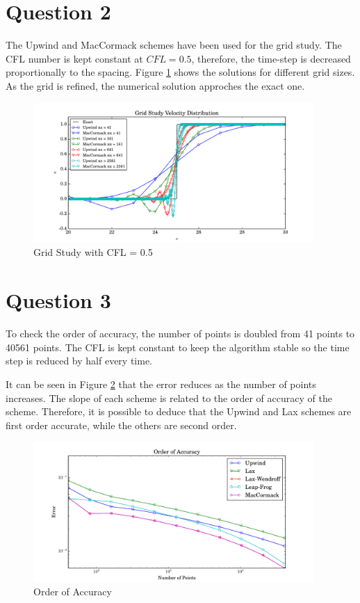 \documentclass[letterpaper,12pt,]{article}
\begin{document}
\newpage
\section*{Question 2}

The Upwind and MacCormack schemes have been used for the grid study.
The CFL number is kept constant at $CFL = 0.5$, therefore, the time-step is decreased proportionally to the spacing.
Figure \ref{fig:q2} shows the solutions for different grid sizes.
As the grid is refined, the numerical solution approches the exact one. 
\begin{figure}[!h]
    \centering
    \includegraphics[width = 0.95\textwidth]{./Figures/q2}
    \caption{Grid Study with CFL = 0.5}
    \label{fig:q2}
\end{figure}

\newpage
\section*{Question 3}

To check the order of accuracy, the number of points is doubled from 41 points to 40561 points.
The CFL is kept constant to keep the algorithm stable so the time step is reduced by half every time.

It can be seen in Figure \ref{fig:q3} that the error reduces as the number of points increases.
The slope of each scheme is related to the order of accuracy of the scheme. 
Therefore, it is possible to deduce that the Upwind and Lax schemes are first order accurate, while the others are second order.

\begin{figure}[!h]
    \centering
    \includegraphics[width = 0.95\textwidth]{./Figures/q3}
    \caption{Order of Accuracy}
    \label{fig:q3}
\end{figure}
\end{document}
